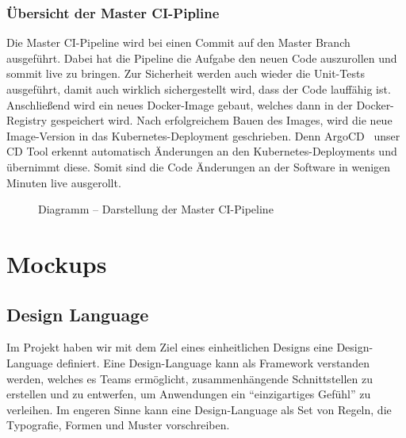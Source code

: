 \subsubsection{Übersicht der Master \ac{CI}-Pipline}
Die Master \ac{CI}-Pipeline wird bei einen Commit auf den Master Branch ausgeführt. Dabei hat die Pipeline die Aufgabe den neuen Code auszurollen und sommit live zu bringen.
Zur Sicherheit werden auch wieder die Unit-Tests ausgeführt, damit auch wirklich sichergestellt wird, dass der Code lauffähig ist. Anschließend wird ein neues Docker-Image gebaut,
welches dann in der Docker-Registry gespeichert wird. Nach erfolgreichem Bauen des Images, wird die neue Image-Version in das Kubernetes-Deployment geschrieben. Denn ArgoCD~\parencite{web/argocd} unser \ac{CD} Tool
erkennt automatisch Änderungen an den Kubernetes-Deployments und übernimmt diese. Somit sind die Code Änderungen an der Software in wenigen Minuten live ausgerollt.
\begin{figure}[!htbp]
    \centering    
    \usetikzlibrary{positioning}
\caption{Diagramm – Darstellung der Master \ac{CI}-Pipeline}
\end{figure}

\section{Mockups}
\subsection{Design Language}
Im Projekt haben wir mit dem Ziel eines einheitlichen Designs eine Design-Language definiert.
Eine Design-Language kann als Framework verstanden werden, welches es Teams ermöglicht, 
zusammenhängende Schnittstellen zu erstellen und zu entwerfen, um Anwendungen ein \enquote{einzigartiges Gefühl} zu verleihen.
Im engeren Sinne kann eine Design-Language als Set von Regeln, die Typografie, Formen und Muster vorschreiben.

